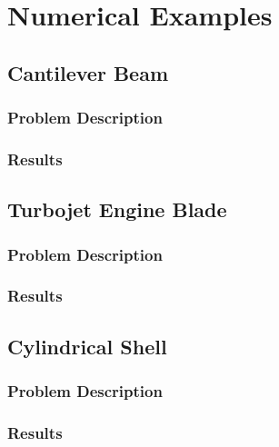 \chapter{Numerical Examples}
\label{chapter:NumericalExamples}

\section{Cantilever Beam}
\subsection{Problem Description}
\subsection{Results}

\section{Turbojet Engine Blade}
\subsection{Problem Description}

\subsection{Results}


\section{Cylindrical Shell}
\subsection{Problem Description}
\subsection{Results}
